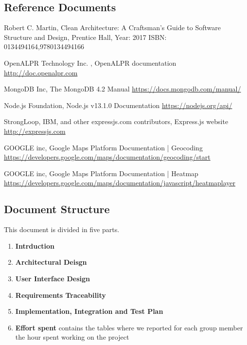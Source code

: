 \subsection{Reference Documents}
\begin{thebibliography}{00}

 Robert C. Martin,
Clean Architecture: A Craftsman’s Guide to Software Structure and Design,
Prentice Hall, Year: 2017
ISBN: 0134494164,9780134494166

OpenALPR Technology Inc. ,
OpenALPR documentation \url{http://doc.openalpr.com}

 MongoDB Inc,
The MongoDB 4.2 Manual
\url{https://docs.mongodb.com/manual/}

 Node.js Foundation,
Node.js v13.1.0 Documentation
\url{https://nodejs.org/api/}

 StrongLoop, IBM, and other expressjs.com contributors,
Express.js website
\url{http://expressjs.com}


 GOOGLE inc,
 Google Maps Platform Documentation | Geocoding
 \url{https://developers.google.com/maps/documentation/geocoding/start}

 GOOGLE inc,
 Google Maps Platform Documentation | Heatmap
 \url{https://developers.google.com/maps/documentation/javascript/heatmaplayer}

\end{thebibliography}

\subsection{Document Structure}
This document is divided in five parts.

\begin{enumerate}
  \item \textbf{Intrduction}

  \item \textbf{Architectural Deisgn}

  \item \textbf{User Interface Design}

  \item \textbf{Requirements Traceability}

  \item \textbf{Implementation, Integration and Test Plan}

  \item \textbf{Effort spent} contains the tables where we reported for each group member the hour spent working on the project
\end{enumerate}
